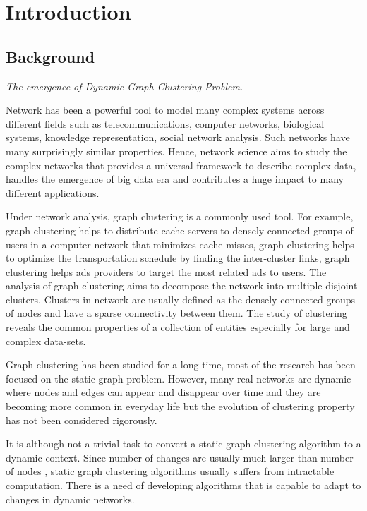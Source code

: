 \chapter{Introduction}

\section{Background}

\begin{center}
\emph{The emergence of Dynamic Graph Clustering Problem.}
\end{center}

Network has been a powerful tool to model many complex systems across different fields such as telecommunications, computer networks, biological systems, knowledge representation, social network analysis. Such networks have many surprisingly similar properties. Hence, network science aims to study the complex networks that provides a universal framework to describe complex data, handles the emergence of big data era and contributes a huge impact to many different applications.

Under network analysis, graph clustering is a commonly used tool. For example, graph clustering helps to distribute cache servers to densely connected groups of users in a computer network that minimizes cache misses, graph clustering helps to optimize the transportation schedule by finding the inter-cluster links, graph clustering helps ads providers to target the most related ads to users. The analysis of graph clustering aims to decompose the network into multiple disjoint clusters. Clusters in network are usually defined as the densely connected groups of nodes and have a sparse connectivity between them. The study of clustering reveals the common properties of a collection of entities especially for large and complex data-sets.

Graph clustering has been studied for a long time, most of the research has been focused on the static graph problem. However, many real networks are dynamic where nodes and edges can appear and disappear over time and they are becoming more common in everyday life but the evolution of clustering property has not been considered rigorously.

It is although not a trivial task to convert a static graph clustering algorithm to a dynamic context. Since number of changes are usually much larger than number of nodes \cite{leskovec2014snap}, static graph clustering algorithms usually suffers from intractable computation. There is a need of developing algorithms that is capable to adapt to changes in dynamic networks.

